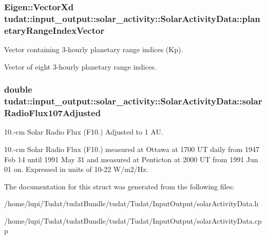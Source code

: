 \subsubsection[{\texorpdfstring{planetary\+Range\+Index\+Vector}{planetaryRangeIndexVector}}]{\setlength{\rightskip}{0pt plus 5cm}Eigen\+::\+Vector\+Xd tudat\+::input\+\_\+output\+::solar\+\_\+activity\+::\+Solar\+Activity\+Data\+::planetary\+Range\+Index\+Vector}\hypertarget{structtudat_1_1input__output_1_1solar__activity_1_1SolarActivityData_ad7ec64845a94f3ccf034e25ad852d050}{}\label{structtudat_1_1input__output_1_1solar__activity_1_1SolarActivityData_ad7ec64845a94f3ccf034e25ad852d050}


Vector containing 3-\/hourly planetary range indices (Kp). 

Vector of eight 3-\/hourly planetary range indices. 
\subsubsection[{\texorpdfstring{solar\+Radio\+Flux107\+Adjusted}{solarRadioFlux107Adjusted}}]{\setlength{\rightskip}{0pt plus 5cm}double tudat\+::input\+\_\+output\+::solar\+\_\+activity\+::\+Solar\+Activity\+Data\+::solar\+Radio\+Flux107\+Adjusted}\hypertarget{structtudat_1_1input__output_1_1solar__activity_1_1SolarActivityData_aa63a9e4acba47229fced3d67282b3106}{}\label{structtudat_1_1input__output_1_1solar__activity_1_1SolarActivityData_aa63a9e4acba47229fced3d67282b3106}


10.-\/cm Solar Radio Flux (F10.) Adjusted to 1 AU. 

10.-\/cm Solar Radio Flux (F10.) measured at Ottawa at 1700 UT daily from 1947 Feb 14 until 1991 May 31 and measured at Penticton at 2000 UT from 1991 Jun 01 on. Expressed in units of 10-\/22 W/m2/\+Hz. 

The documentation for this struct was generated from the following files\+:\begin{DoxyCompactItemize}
\item 
/home/lupi/\+Tudat/tudat\+Bundle/tudat/\+Tudat/\+Input\+Output/solar\+Activity\+Data.\+h\item 
/home/lupi/\+Tudat/tudat\+Bundle/tudat/\+Tudat/\+Input\+Output/solar\+Activity\+Data.\+cpp\end{DoxyCompactItemize}

